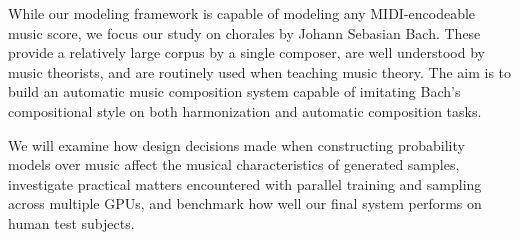 While our modeling framework is capable of modeling any MIDI-encodeable music
score, we focus our study on chorales by Johann Sebasian Bach. These provide
a relatively large corpus by a single composer, are well understood by music
theorists, and are routinely used when teaching music theory.
The aim is to build an automatic music composition system capable of imitating
Bach's compositional style on both harmonization and automatic composition tasks.

We will examine how design decisions made when constructing probability models
over music affect the musical characteristics of generated samples, investigate
practical matters encountered with parallel training and sampling across
multiple GPUs, and benchmark how well our final system performs on human test
subjects.

